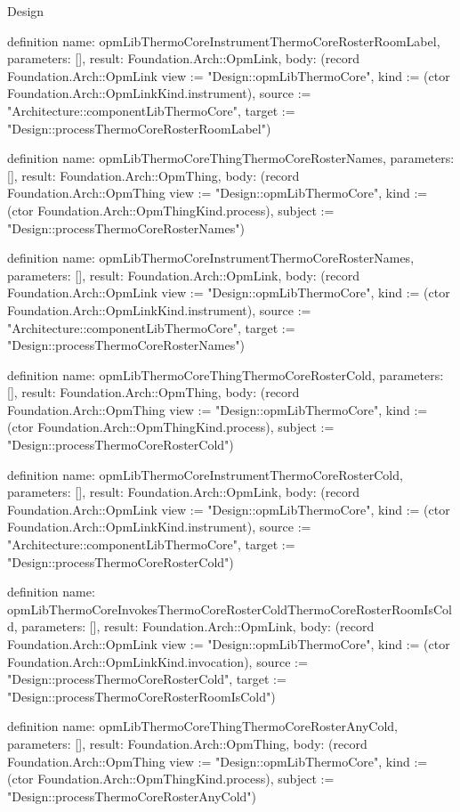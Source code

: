 \begin{lexlean}{Design}
\begin{semanticmodule}
definition{
  name: opmLibThermoCoreInstrumentThermoCoreRosterRoomLabel,
  parameters: [],
  result: Foundation.Arch::OpmLink,
  body: (record Foundation.Arch::OpmLink {view := "Design::opmLibThermoCore", kind := (ctor Foundation.Arch::OpmLinkKind.instrument), source := "Architecture::componentLibThermoCore", target := "Design::processThermoCoreRosterRoomLabel"})
}

definition{
  name: opmLibThermoCoreThingThermoCoreRosterNames,
  parameters: [],
  result: Foundation.Arch::OpmThing,
  body: (record Foundation.Arch::OpmThing {view := "Design::opmLibThermoCore", kind := (ctor Foundation.Arch::OpmThingKind.process), subject := "Design::processThermoCoreRosterNames"})
}

definition{
  name: opmLibThermoCoreInstrumentThermoCoreRosterNames,
  parameters: [],
  result: Foundation.Arch::OpmLink,
  body: (record Foundation.Arch::OpmLink {view := "Design::opmLibThermoCore", kind := (ctor Foundation.Arch::OpmLinkKind.instrument), source := "Architecture::componentLibThermoCore", target := "Design::processThermoCoreRosterNames"})
}

definition{
  name: opmLibThermoCoreThingThermoCoreRosterCold,
  parameters: [],
  result: Foundation.Arch::OpmThing,
  body: (record Foundation.Arch::OpmThing {view := "Design::opmLibThermoCore", kind := (ctor Foundation.Arch::OpmThingKind.process), subject := "Design::processThermoCoreRosterCold"})
}

definition{
  name: opmLibThermoCoreInstrumentThermoCoreRosterCold,
  parameters: [],
  result: Foundation.Arch::OpmLink,
  body: (record Foundation.Arch::OpmLink {view := "Design::opmLibThermoCore", kind := (ctor Foundation.Arch::OpmLinkKind.instrument), source := "Architecture::componentLibThermoCore", target := "Design::processThermoCoreRosterCold"})
}

definition{
  name: opmLibThermoCoreInvokesThermoCoreRosterColdThermoCoreRosterRoomIsCold,
  parameters: [],
  result: Foundation.Arch::OpmLink,
  body: (record Foundation.Arch::OpmLink {view := "Design::opmLibThermoCore", kind := (ctor Foundation.Arch::OpmLinkKind.invocation), source := "Design::processThermoCoreRosterCold", target := "Design::processThermoCoreRosterRoomIsCold"})
}

definition{
  name: opmLibThermoCoreThingThermoCoreRosterAnyCold,
  parameters: [],
  result: Foundation.Arch::OpmThing,
  body: (record Foundation.Arch::OpmThing {view := "Design::opmLibThermoCore", kind := (ctor Foundation.Arch::OpmThingKind.process), subject := "Design::processThermoCoreRosterAnyCold"})
}


\end{semanticmodule}
\end{lexlean}
